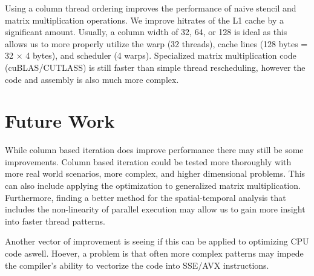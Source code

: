 Using a column thread ordering improves the performance of naive stencil and matrix multiplication operations.
We improve hitrates of the L1 cache by a significant amount.
Usually, a column width of 32, 64, or 128 is ideal as this allows us to more properly utilize the warp (32 threads), cache lines (128 bytes = 32 $\times$ 4 bytes), and scheduler (4 warps).
Specialized matrix multiplication code (cuBLAS/CUTLASS) is still faster than simple thread rescheduling, however the code and assembly is also much more complex.

\section{Future Work}
While column based iteration does improve performance there may still be some improvements.
Column based iteration could be tested more thoroughly with more real world scenarios, more complex, and higher dimensional problems.
This can also include applying the optimization to generalized matrix multiplication.
Furthermore, finding a better method for the spatial-temporal analysis that includes the non-linearity of parallel execution may allow us to gain more insight into faster thread patterns.

Another vector of improvement is seeing if this can be applied to optimizing CPU code aswell.
Hoever, a problem is that often more complex patterns may impede the compiler's ability to vectorize the code into SSE/AVX instructions.
